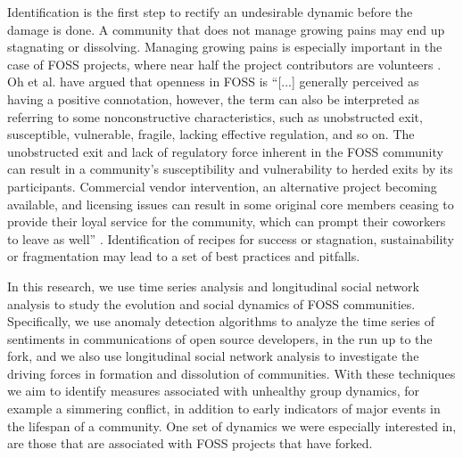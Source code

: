 \documentclass[12pt]{report}
\begin{document}
Identification is the first step to rectify an undesirable dynamic before the damage is done. A community that does not manage growing pains may end up stagnating or dissolving. Managing growing pains is especially important in the case of FOSS projects, where near half the project contributors are volunteers \cite{Forrest}. Oh et al. \cite{Oh} have argued that openness in FOSS is ``[...] generally perceived as having a positive connotation, however, the term can also be interpreted as referring to some nonconstructive characteristics, such as unobstructed exit, susceptible, vulnerable, fragile, lacking effective regulation, and so on. The unobstructed exit and lack of regulatory force inherent in the FOSS community can result in a community's susceptibility and vulnerability to herded exits by its participants. Commercial vendor intervention, an alternative project becoming available, and licensing issues can result in some original core members ceasing to provide their loyal service for the community, which can prompt their coworkers to leave as well'' \cite{Oh}. Identification of recipes for success or stagnation, sustainability or fragmentation may lead to a set of best practices and pitfalls.

In this research, we use time series analysis and longitudinal social network analysis to study the evolution and social dynamics of FOSS communities. Specifically, we use anomaly detection algorithms to analyze the time series of sentiments in communications of open source developers, in the run up to the fork, and we also use longitudinal social network analysis to investigate the driving forces in formation and dissolution of communities. With these techniques we aim to identify measures associated with unhealthy group dynamics, for example a simmering conflict, in addition to early indicators of major events in the lifespan of a community. One set of dynamics we were especially interested in, are those that are associated with FOSS projects that have forked.
\end{document}
